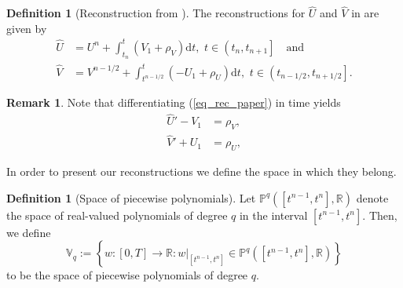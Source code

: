 \documentclass[12pt,a4paper]{article}
\numberwithin{equation}{section}
\theoremstyle{definition}
\newcommand{\polygs}[3]{\mathbb{P}^{#1}\qp{#2,#3}}
\newcommand{\qp}[1]{\left(#1\right)}
\newcommand{\qpb}[1]{\left(#1\right]}
\newcommand{\qb}[1]{\left[#1\right]}
\newcommand{\rec}[1]{\widehat{{#1}}}
\newcommand{\bracegs}[1]{\left\lbrace#1\right\rbrace}
\newtheorem{Defn}[subsection]{Definition}
\newtheorem{Rem}[subsection]{Remark}
\begin{document}
\begin{Defn}[Reconstruction from \cite{georgoulis2016posteriori}]\label{defn_rec_paper}
The reconstructions for $\rec{U}$ and $\rec{V}$ in \cite[\S3.1]{georgoulis2016posteriori} are given by 
\begin{equation}\label{eq_rec_paper}
\begin{aligned}
\hat{U}&=U^n +\int_{t_n}^{t}\left(V_1+\rho_V\right)\mathrm{d}t, \,\, t\in\qpb{t_n,t_{n+1}}\quad \text{and}\\
\hat{V}&=V^{n-1/2}+\int_{t^{n-1/2}}^{t}\left(-U_1+\rho_U\right)\mathrm{d}t, \,\, t\in\qpb{t_{n-1/2},t_{n+1/2}}.
\end{aligned}
\end{equation}
\end{Defn}
\begin{Rem}
Note that differentiating (\ref{eq_rec_paper}) in time yields
\begin{equation}\label{eq_model_recs}
\begin{aligned}
\rec{U}'-V_1&=\rho_V,\\
\rec{V}'+U_1&=\rho_U,
\end{aligned}
\end{equation}
\end{Rem}


 In order to present our reconstructions we  define the space in which they belong. 
  \begin{Defn}[Space of piecewise polynomials]\label{defn_space_pwpoly}
 	Let $\polygs{q}{\qb{t^{n-1},t^n}}{\mathbb{R}}$ denote the space of real-valued polynomials of degree $q$ in the interval $\qb{t^{n-1}, t^n}$.  Then, we define 
 	\begin{equation}
 	\mathbb{V}_q:=\bracegs{w:\qb{0,T}\rightarrow\mathbb{R}: w|_{\qb{t^{n-1},t^n}}\in \polygs{q}{\qb{t^{n-1},t^n}}{\mathbb{R}}}
 	\end{equation}
 	to be the space of piecewise polynomials of degree $q$.
 \end{Defn}
 
\end{document}
